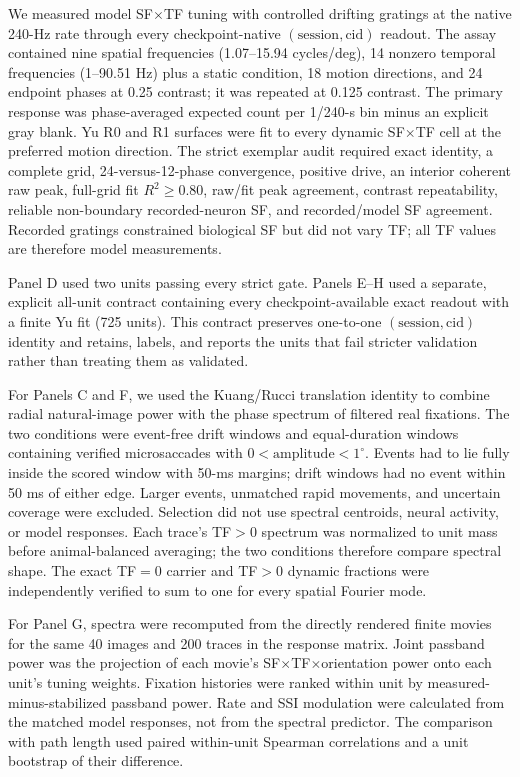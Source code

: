 We measured model SF$\times$TF tuning with controlled drifting gratings at the
native 240-Hz rate through every checkpoint-native
$(\mathrm{session},\mathrm{cid})$ readout. The assay contained nine spatial
frequencies (1.07--15.94 cycles/deg), 14 nonzero temporal frequencies
(1--90.51 Hz) plus a static condition, 18 motion directions, and 24 endpoint
phases at 0.25 contrast; it was repeated at 0.125 contrast. The primary
response was phase-averaged expected count per 1/240-s bin minus an explicit
gray blank. Yu R0 and R1 surfaces were fit to every dynamic SF$\times$TF cell
at the preferred motion direction. The strict exemplar audit required exact
identity, a complete grid, 24-versus-12-phase convergence, positive drive, an
interior coherent raw peak, full-grid fit $R^2\geq0.80$, raw/fit peak
agreement, contrast repeatability, reliable non-boundary recorded-neuron SF,
and recorded/model SF agreement. Recorded gratings constrained biological SF
but did not vary TF; all TF values are therefore model measurements.

Panel D used two units passing every strict gate. Panels E--H used a separate,
explicit all-unit contract containing every checkpoint-available exact readout
with a finite Yu fit (725 units). This contract preserves one-to-one
$(\mathrm{session},\mathrm{cid})$ identity and retains, labels, and reports the
units that fail stricter validation rather than treating them as validated.

For Panels C and F, we used the Kuang/Rucci translation identity to combine
radial natural-image power with the phase spectrum of filtered real fixations.
The two conditions were event-free drift windows and equal-duration windows
containing verified microsaccades with $0<\mathrm{amplitude}<1^\circ$.
Events had to lie fully inside the scored window with 50-ms margins; drift
windows had no event within 50 ms of either edge. Larger events, unmatched
rapid movements, and uncertain coverage were excluded. Selection did not use
spectral centroids, neural activity, or model responses.
Each trace's TF$>0$ spectrum was normalized to unit mass before
animal-balanced averaging; the two conditions therefore compare spectral
shape. The exact TF$=0$ carrier and TF$>0$ dynamic fractions were independently
verified to sum to one for every spatial Fourier mode.

For Panel G, spectra were recomputed from the directly rendered finite movies
for the same 40 images and 200 traces in the response matrix. Joint passband
power was the projection of each movie's
SF$\times$TF$\times$orientation power onto each unit's tuning weights.
Fixation histories were ranked within unit by measured-minus-stabilized
passband power. Rate and SSI modulation were calculated from the matched model
responses, not from the spectral predictor. The comparison with path length
used paired within-unit Spearman correlations and a unit bootstrap of their
difference.

